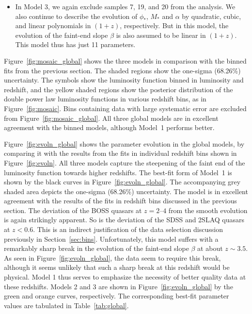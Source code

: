 \documentclass[a4paper,fleqn,usenatbib]{mnras}
\begin{document}
\begin{itemize}
\item In Model 3, we again exclude samples 7, 19, and 20 from the
  analysis.  We also continue to describe the evolution of $\phi_*$,
  $M_*$ and $\alpha$ by quadratic, cubic, and linear polynomials in
  $(1+z)$, respectively.  But in this model, the evolution of the
  faint-end slope $\beta$ is also assumed to be linear in $(1+z)$.
  This model thus has just 11 parameters.
\end{itemize}

Figure~\ref{fig:mosaic_global} shows the three models in comparison
with the binned fits from the previous section.  The shaded regions
show the one-sigma (68.26\%) uncertainty.  The symbols show the
luminosity function binned in luminosity and redshift, and the yellow
shaded regions show the posterior distribution of the double power law
luminosity functions in various redshift bins, as in
Figure~\ref{fig:mosaic}.  Bins containing data with large systematic
error are excluded from Figure~\ref{fig:mosaic_global}.  All three
global models are in excellent agreement with the binned models,
although Model~1 performs better.  

Figure~\ref{fig:evoln_global} shows the parameter evolution in the
global models, by comparing it with the results from the fits in
individual redshift bins shown in Figure~\ref{fig:evoln}.  All three
models capture the steepening of the faint end of the luminosity
function towards higher redshifts.  The best-fit form of Model~1 is
shown by the black curves in Figure~\ref{fig:evoln_global}.  The
accompanying grey shaded area depicts the one-sigma (68.26\%)
uncertainty.  The model is in excellent agreement with the results of
the fits in redshift bins discussed in the previous section.  The
deviation of the BOSS quasars at $z=2$--$4$ from the smooth evolution
is again strikingly apparent.  So is the deviation of the SDSS and
2SLAQ quasars at $z<0.6$.  This is an indirect justification of the
data selection discussion previously in Section~\ref{sec:bins}.
Unfortunately, this model suffers with a remarkably sharp break in the
evolution of the faint-end slope $\beta$ at about $z\sim 3.5$.  As
seen in Figure~\ref{fig:evoln_global}, the data seem to require this
break, although it seems unlikely that such a sharp break at this
redshift would be physical.  Model 1 thus serves to emphasize the
necessity of better quality data at these redshifts.  Models 2 and 3
are shown in Figure~\ref{fig:evoln_global} by the green and orange
curves, respectively.  The corresponding best-fit parameter values are
tabulated in Table~\ref{tab:global}.
\end{document}
